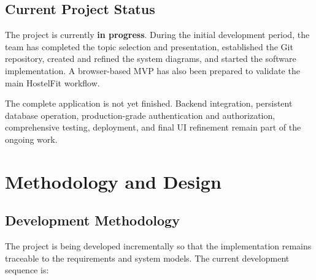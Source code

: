 \documentclass[11pt,a4paper]{article}
\begin{document}
\section{Current Project Status}
The project is currently \textbf{in progress}. During the initial development period, the team has completed the topic selection and presentation, established the Git repository, created and refined the system diagrams, and started the software implementation. A browser-based MVP has also been prepared to validate the main HostelFit workflow.

The complete application is not yet finished. Backend integration, persistent database operation, production-grade authentication and authorization, comprehensive testing, deployment, and final UI refinement remain part of the ongoing work.

\chapter{Methodology and Design}

\section{Development Methodology}
The project is being developed incrementally so that the implementation remains traceable to the requirements and system models. The current development sequence is:

\begin{center}
\end{center}
\end{document}
